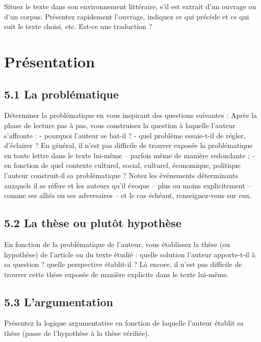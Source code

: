 Situez le texte dans son environnement littéraire, s’il est extrait d’un ouvrage ou d’un corpus. Présentez rapidement l’ouvrage, indiquez ce qui précède et ce qui suit le texte choisi, etc. Est-ce une traduction ? 



\section{Présentation}


	\subsection{5.1 La problématique }

Déterminer la problématique en vous inspirant des questions suivantes :
Après la phase de lecture pas à pas, vous construisez la question à laquelle l’auteur s’affronte :
-	pourquoi l’auteur se bat-il ?
-	quel problème essaie-t-il de régler, d’éclairer ? En général, il n’est pas difficile de trouver exposée la problématique en toute lettre dans le texte lui-même – parfois même de manière redondante ;
-	en fonction de quel contexte culturel, social, culturel, économique, politique l’auteur construit-il sa problématique ? Notez les événements déterminants auxquels il se réfère et les auteurs qu’il évoque – plus ou moins explicitement – comme ses alliés ou ses adversaires – et le cas échéant, renseignez-vous sur eux. 

\subsection{5.2	 La thèse ou plutôt hypothèse}

En fonction de la problématique de l’auteur, vous établissez la thèse (ou hypothèse) de l’article ou du texte étudié : quelle solution l’auteur apporte-t-il à sa question ? quelle perspective établit-il ? Là encore, il n’est pas difficile de trouver cette thèse exposée de manière explicite dans le texte lui-même. 

\subsection{5.3	 L’argumentation }


Présentez la logique argumentative en fonction de laquelle l’auteur établit sa thèse (passe de l’hypothèse à la thèse vérifiée).



